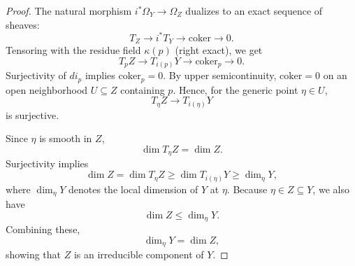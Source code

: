 \documentclass{amsart}
\begin{document}
\begin{proof}
The natural morphism \( i^* \Omega_Y \to \Omega_Z \) dualizes to an exact sequence of sheaves:
\[
T_Z \to i^* T_Y \to \mathrm{coker} \to 0.
\]
Tensoring with the residue field \(\kappa(p)\) (right exact), we get
\[
T_p Z \to T_{i(p)} Y \to \mathrm{coker}_p \to 0.
\]
Surjectivity of \( di_p \) implies \(\mathrm{coker}_p = 0\). By upper semicontinuity, \( \mathrm{coker} = 0 \) on an open neighborhood \( U \subseteq Z \) containing \( p \). Hence, for the generic point \(\eta \in U\), 
\[
T_\eta Z \to T_{i(\eta)} Y
\]
is surjective.

Since \(\eta\) is smooth in \(Z\),
\[
\dim T_\eta Z = \dim Z.
\]
Surjectivity implies
\[
\dim Z = \dim T_\eta Z \geq \dim T_{i(\eta)} Y \geq \dim_\eta Y,
\]
where \(\dim_\eta Y\) denotes the local dimension of \(Y\) at \(\eta\). Because \(\eta \in Z \subseteq Y\), we also have
\[
\dim Z \leq \dim_\eta Y.
\]
Combining these,
\[
\dim_\eta Y = \dim Z,
\]
showing that \( Z \) is an irreducible component of \( Y \).
\end{proof}
\end{document}
